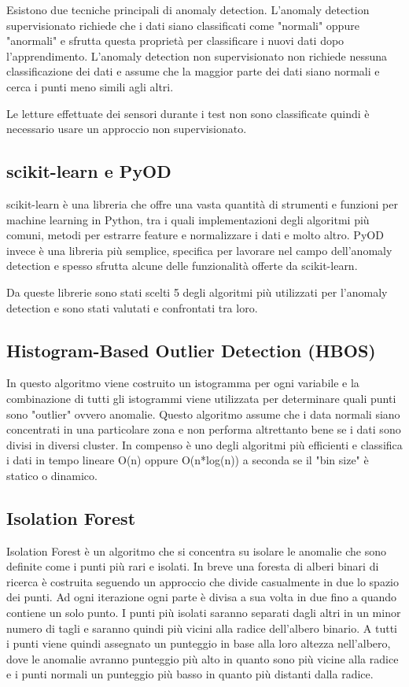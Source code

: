 Esistono due tecniche principali di anomaly detection. L'anomaly detection supervisionato richiede che i dati siano classificati come "normali" oppure "anormali" e sfrutta questa proprietà per classificare i nuovi dati dopo l'apprendimento. L'anomaly detection non supervisionato non richiede nessuna classificazione dei dati e assume che la maggior parte dei dati siano normali e cerca i punti  meno simili agli altri.

Le letture effettuate dei sensori durante i test non sono classificate quindi è necessario usare un approccio non supervisionato. 

\subsection{scikit-learn e PyOD}
scikit-learn è una libreria che offre una vasta quantità di strumenti e funzioni per machine learning in Python, tra i quali implementazioni degli algoritmi più comuni, metodi per estrarre feature e normalizzare i dati e molto altro.
PyOD invece è una libreria più semplice, specifica per lavorare nel campo dell'anomaly detection e spesso sfrutta alcune delle funzionalità offerte da scikit-learn.

Da queste librerie sono stati scelti 5 degli algoritmi più utilizzati per l'anomaly detection e sono stati valutati e confrontati tra loro.

\subsection{Histogram-Based Outlier Detection (HBOS)}
In questo algoritmo viene costruito un istogramma per ogni variabile e la combinazione di tutti gli istogrammi viene utilizzata per determinare quali punti sono "outlier" ovvero anomalie. Questo algoritmo assume che i data normali siano concentrati in una particolare zona e non performa altrettanto bene se i dati sono divisi in diversi cluster. In compenso è uno degli algoritmi più efficienti e classifica i dati in tempo lineare O(n) oppure O(n*log(n)) a seconda se il "bin size" è statico o dinamico.

\subsection{Isolation Forest}
Isolation Forest è un algoritmo che si concentra su isolare le anomalie che sono definite come i punti più rari e isolati. In breve una foresta di alberi binari di ricerca è costruita seguendo un approccio che divide casualmente in due lo spazio dei punti. Ad ogni iterazione ogni parte è divisa a sua volta in due fino a quando contiene un solo punto. I punti più isolati saranno separati dagli altri in un minor numero di tagli e saranno quindi più vicini alla radice dell'albero binario. A tutti i punti viene quindi assegnato un punteggio in base alla loro altezza nell'albero, dove le anomalie avranno punteggio più alto in quanto sono più vicine alla radice e i punti normali un punteggio più basso in quanto più distanti dalla radice.


